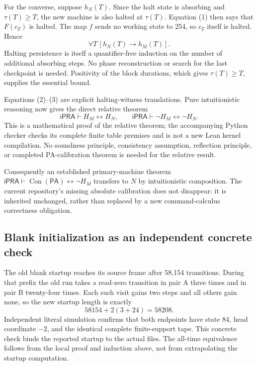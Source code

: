 For the converse, suppose $h_N(T)$.  Since the halt state is absorbing
and $\tau(T)\ge T$, the new machine is also halted at $\tau(T)$.
Equation (1) then says that $F(c_T)$ is halted.  The map $f$ sends no
working state to 254, so $c_T$ itself is halted.  Hence
\[
 \forall T\,[h_N(T)\to h_M(T)].                          \tag{3}
\]
Halting persistence is itself a quantifier-free induction on the number
of additional absorbing steps.  No phase reconstruction or search for
the last checkpoint is needed.  Positivity of the block durations,
which gives $\tau(T)\ge T$, supplies the essential bound.

Equations (2)--(3) are explicit halting-witness translations.  Pure
intuitionistic reasoning now gives the direct relative theorem
\[
 \boxed{\mathsf{iPRA}\vdash H_M\leftrightarrow H_N,\qquad
        \mathsf{iPRA}\vdash\neg H_M\leftrightarrow\neg H_N.}
\]
This is a mathematical proof of the relative theorem; the accompanying
Python checker checks its complete finite table premises and is not a
new Lean kernel compilation.  No soundness principle, consistency
assumption, reflection principle, or completed PA-calibration theorem is
needed for the relative result.

Consequently an established primary-machine theorem
$\mathsf{iPRA}\vdash\operatorname{Con}(\mathsf{PA})
\leftrightarrow\neg H_M$ transfers to $N$ by intuitionistic
composition.  The current repository's missing absolute calibration
does not disappear: it is inherited unchanged, rather than replaced by
a new command-calculus correctness obligation.

\subsection{Blank initialization as an independent concrete check}

The old blank startup reaches its source frame after 58,154 transitions.
During that prefix the old run takes a read-zero transition in pair A
three times and in pair B twenty-four times.  Each such visit gains two
steps and all others gain none, so the new startup length is exactly
\[
 58154+2(3+24)=58208.
\]
Independent literal simulation confirms that both endpoints have state
84, head coordinate $-2$, and the identical complete finite-support tape.
This concrete check binds the reported startup to the actual files.
The all-time equivalence follows from the local proof and induction
above, not from extrapolating the startup computation.
